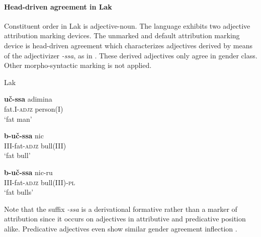 \paragraph*{Head\hyp{}driven agreement in Lak}
Constituent order in Lak is adjective-noun. The language exhibits two adjective attribution marking devices. The unmarked and default attribution marking device is head\hyp{}driven agreement which characterizes adjectives derived by means of the adjectivizer \mbox{\textit{-ssa}}, as in . These derived adjectives only agree in gender class. Other morpho-syntactic marking is not applied.
\begin{exe}
\ex 
\label{lak hdragr}
\rm{Lak \citep[48]{zirkov1955}} 
\begin{xlist}
\ex 
\gll	\textbf{uč-ssa} adimina\\
	fat.\textsc{I}-\textsc{adjz} person(\textsc{I})\\
\glt	‘fat man’

\ex
\gll	\textbf{b-uč-ssa} nic\\
	\textsc{III}-fat-\textsc{adjz} bull\textsc{(III)}\\
\glt	‘fat bull’

\ex
\gll	\textbf{b-uč-ssa} nic-ru\\
	\textsc{III}-fat-\textsc{adjz} bull\textsc{(III)}-\textsc{pl}\\
\glt	‘fat bulls’
\end{xlist}
\end{exe}
Note that the suffix \textit{-ssa} is a derivational formative rather than a marker of attribution since it occurs on adjectives in attributive and predicative position alike. Predicative adjectives even show similar gender agreement inflection \citep[45–51]{zirkov1955}.


